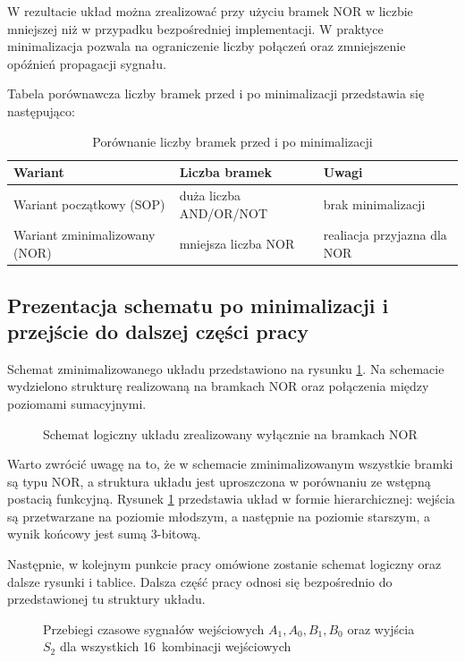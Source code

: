 \documentclass[11pt]{article}
\begin{document}
W rezultacie układ można zrealizować przy użyciu bramek NOR w liczbie mniejszej niż w przypadku bezpośredniej implementacji. W praktyce minimalizacja pozwala na ograniczenie liczby połączeń oraz zmniejszenie opóźnień propagacji sygnału.

Tabela porównawcza liczby bramek przed i po minimalizacji przedstawia się następująco:
\begin{table}[h]
\centering
\caption{Porównanie liczby bramek przed i po minimalizacji}
\begin{tabular}{lll}
\toprule
Wariant & Liczba bramek & Uwagi \\
\midrule
Wariant początkowy (SOP) & duża liczba AND/OR/NOT & brak minimalizacji \\
Wariant zminimalizowany (NOR) & mniejsza liczba NOR & realiacja przyjazna dla NOR \\
\bottomrule
\end{tabular}
\end{table}

\subsection{Prezentacja schematu po minimalizacji i przejście do dalszej części pracy}

Schemat zminimalizowanego układu przedstawiono na rysunku \ref{fig:schemat_min}. Na schemacie wydzielono strukturę realizowaną na bramkach NOR oraz połączenia między poziomami sumacyjnymi.

\begin{figure}[h]
\centering
\resizebox{\linewidth}{!}{\RysSchematNOR}
\caption{Schemat logiczny układu zrealizowany wyłącznie na bramkach NOR}
\label{fig:schemat_min}
\end{figure}

Warto zwrócić uwagę na to, że w schemacie zminimalizowanym wszystkie bramki są typu NOR, a struktura układu jest uproszczona w porównaniu ze wstępną postacią funkcyjną. Rysunek \ref{fig:schemat_min} przedstawia układ w formie hierarchicznej: wejścia są przetwarzane na poziomie młodszym, a następnie na poziomie starszym, a wynik końcowy jest sumą 3-bitową.

Następnie, w kolejnym punkcie pracy omówione zostanie schemat logiczny oraz dalsze rysunki i tablice. Dalsza część pracy odnosi się bezpośrednio do przedstawionej tu struktury układu.

\begin{figure}[h]
\centering
\resizebox{0.85\linewidth}{!}{\RysPrzebiegi}
\caption{Przebiegi czasowe sygnałów wejściowych $A_1, A_0, B_1, B_0$ oraz wyjścia $S_2$ dla wszystkich 16~kombinacji wejściowych}
\label{fig:przejscie_point3}
\end{figure}
\end{document}
